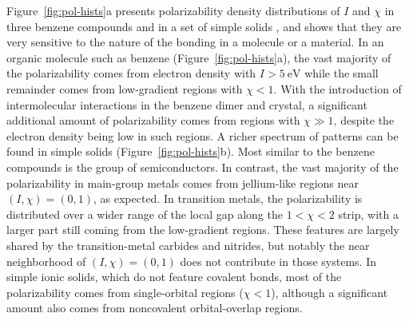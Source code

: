 Figure~\ref{fig:pol-hists}a presents polarizability density distributions of $I$ and $\chi$ in three benzene compounds and in a set of simple solids \citep{ZhangNJP18}, and shows that they are very sensitive to the nature of the bonding in a molecule or a material.
In an organic molecule such as benzene (Figure~\ref{fig:pol-hists}a), the vast majority of the polarizability
comes from electron density with $I>\SI{5}{\electronvolt}$ while the small remainder comes
from low-gradient regions with $\chi<1$.
With the introduction of intermolecular interactions in the benzene dimer and crystal, a significant additional amount of polarizability comes from regions with $\chi\gg1$, despite the electron density being low in such regions.
A richer spectrum of patterns can be found in simple solids (Figure~\ref{fig:pol-hists}b).
Most similar to the benzene compounds is the group of semiconductors.
In contrast, the vast majority of the polarizability in main-group metals comes from jellium-like regions near $(I,\chi)=(0,1)$, as expected.
In transition metals, the polarizability is distributed over a wider range of the local gap along the $1<\chi<2$ strip, with a larger part still coming from the low-gradient regions.
These features are largely shared by the transition-metal carbides and nitrides, but notably the near neighborhood of $(I,\chi)=(0,1)$ does not contribute in those systems.
In simple ionic solids, which do not feature covalent bonds, most of the polarizability comes from single-orbital regions ($\chi<1$), although a significant amount also comes from noncovalent orbital-overlap regions.

